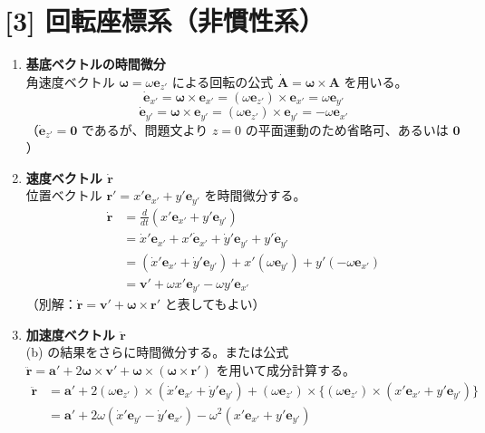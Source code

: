 \documentclass[a4paper,12pt]{jlreq}
\begin{document}
\section*{[3] 回転座標系（非慣性系）}

\begin{enumerate}[label=(\alph*)]
    \item \textbf{基底ベクトルの時間微分} \\
    角速度ベクトル $\bm{\omega} = \omega \bm{e}_{z'}$ による回転の公式 $\dot{\bm{A}} = \bm{\omega} \times \bm{A}$ を用いる。
    \[
    \dot{\bm{e}}_{x'} = \bm{\omega} \times \bm{e}_{x'} = (\omega \bm{e}_{z'}) \times \bm{e}_{x'} = \omega \bm{e}_{y'}
    \]
    \[
    \dot{\bm{e}}_{y'} = \bm{\omega} \times \bm{e}_{y'} = (\omega \bm{e}_{z'}) \times \bm{e}_{y'} = -\omega \bm{e}_{x'}
    \]
    （$\dot{\bm{e}}_{z'} = \bm{0}$ であるが、問題文より $z=0$ の平面運動のため省略可、あるいは $\bm{0}$）

    \item \textbf{速度ベクトル $\dot{\bm{r}}$} \\
    位置ベクトル $\bm{r}' = x'\bm{e}_{x'} + y'\bm{e}_{y'}$ を時間微分する。
    \begin{align*}
    \dot{\bm{r}} &= \frac{d}{dt}(x'\bm{e}_{x'} + y'\bm{e}_{y'}) \\
                 &= \dot{x}'\bm{e}_{x'} + x'\dot{\bm{e}}_{x'} + \dot{y}'\bm{e}_{y'} + y'\dot{\bm{e}}_{y'} \\
                 &= (\dot{x}'\bm{e}_{x'} + \dot{y}'\bm{e}_{y'}) + x'(\omega \bm{e}_{y'}) + y'(-\omega \bm{e}_{x'}) \\
                 &= \bm{v}' + \omega x' \bm{e}_{y'} - \omega y' \bm{e}_{x'}
    \end{align*}
    （別解：$\dot{\bm{r}} = \bm{v}' + \bm{\omega} \times \bm{r}'$ と表してもよい）

    \item \textbf{加速度ベクトル $\ddot{\bm{r}}$} \\
    (b) の結果をさらに時間微分する。または公式 $\ddot{\bm{r}} = \bm{a}' + 2\bm{\omega} \times \bm{v}' + \bm{\omega} \times (\bm{\omega} \times \bm{r}')$ を用いて成分計算する。
    \begin{align*}
    \ddot{\bm{r}} &= \bm{a}' + 2(\omega \bm{e}_{z'}) \times (\dot{x}'\bm{e}_{x'} + \dot{y}'\bm{e}_{y'}) + (\omega \bm{e}_{z'}) \times \{(\omega \bm{e}_{z'}) \times (x'\bm{e}_{x'} + y'\bm{e}_{y'})\} \\
                  &= \bm{a}' + 2\omega(\dot{x}'\bm{e}_{y'} - \dot{y}'\bm{e}_{x'}) - \omega^2(x'\bm{e}_{x'} + y'\bm{e}_{y'})
    \end{align*}


\end{enumerate}
\end{document}
